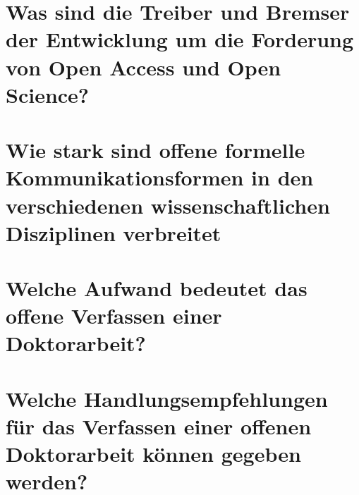 \section{Was sind die Treiber und Bremser der Entwicklung um die Forderung von Open Access und Open Science?}

\section{Wie stark sind offene formelle Kommunikationsformen in den verschiedenen wissenschaftlichen Disziplinen verbreitet}

\section{Welche Aufwand bedeutet das offene Verfassen einer Doktorarbeit?}

\section{Welche Handlungsempfehlungen für das Verfassen einer offenen Doktorarbeit können gegeben werden?} 
